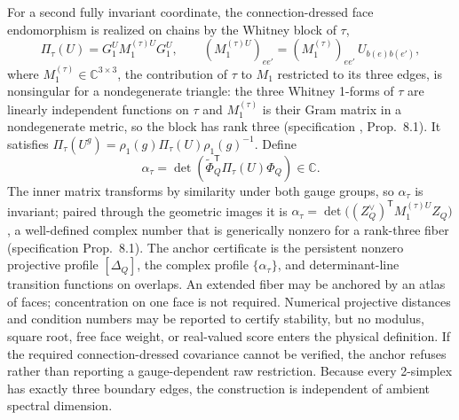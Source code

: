 \documentclass[11pt,letterpaper]{article}
\begin{document}
For a second fully invariant coordinate, the connection-dressed face
endomorphism is realized on chains by the Whitney block of $\tau$,
\begin{equation*}
  \Pi_\tau(U)=G_1^{U}M_1^{(\tau)U}G_1^{U},\qquad
  (M_1^{(\tau)U})_{ee'}=(M_1^{(\tau)})_{ee'}\,U_{b(e)b(e')},
\end{equation*}
where $M_1^{(\tau)}\in\mathbb C^{3\times3}$, the contribution of $\tau$ to
$M_1$ restricted to its three edges, is nonsingular for a nondegenerate
triangle: the three Whitney 1-forms of $\tau$ are linearly independent
functions on $\tau$ and $M_1^{(\tau)}$ is their Gram matrix in a nondegenerate
metric, so the block has rank three (specification \cite{whitneyspec},
Prop.~8.1). It satisfies
$\Pi_\tau(U^g)=\rho_1(g)\Pi_\tau(U)\rho_1(g)^{-1}$. Define
\begin{equation*}
  \alpha_\tau=
  \det\!\left(
    \widetilde\Phi_Q^{\mathsf T}
    \Pi_\tau(U)\Phi_Q
  \right)\in\mathbb C .
\end{equation*}
The inner matrix transforms by similarity under both gauge groups, so
$\alpha_\tau$ is invariant; paired through the geometric images it is
$\alpha_\tau=\det\bigl((Z_Q^{\vee})^{\mathsf T}M_1^{(\tau)U}Z_Q\bigr)$, a
well-defined complex number that is generically nonzero for a rank-three
fiber (specification Prop.~8.1).
The anchor certificate is the persistent nonzero projective profile
$[\Delta_Q]$, the complex profile $\{\alpha_\tau\}$, and determinant-line
transition functions on overlaps. An extended fiber may be anchored by an
atlas of faces; concentration on one face is not required. Numerical
projective distances and condition numbers may be reported to certify
stability, but no modulus, square root, free face weight, or real-valued score
enters the physical definition. If the required connection-dressed covariance
cannot be verified, the anchor refuses rather than reporting a
gauge-dependent raw restriction. Because every 2-simplex has exactly three
boundary edges, the construction is independent of ambient spectral dimension.
\end{document}
